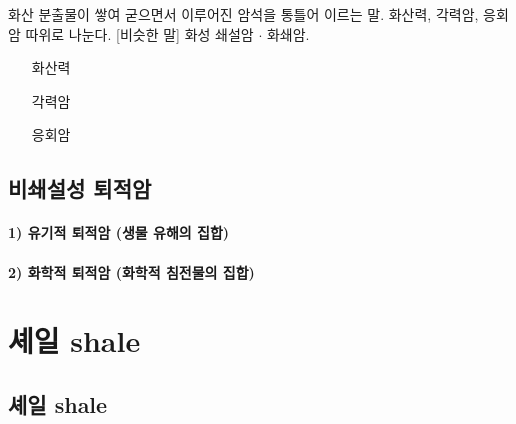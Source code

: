 \documentclass[12pt, a4paper, twoside]{book}
\begin{document}
					화산 분출물이 쌓여 굳으면서 이루어진 암석을 통틀어 이르는 말. 화산력, 각력암, 응회암 따위로 나눈다. 
					[비슷한 말] 화성 쇄설암 $\cdot$ 화쇄암.

				\begin{itemize}[topsep=0.0em, parsep=0.0em, itemsep=0em, leftmargin=6.0em, labelwidth=3em, labelsep=3em] 
				\item [화산력]
				\item [각력암]
				\item [응회암]
				\end{itemize}

		\subsection{비쇄설성 퇴적암}

			\paragraph{1) 유기적 퇴적암 (생물 유해의 집합)} 

			\paragraph{2) 화학적 퇴적암 (화학적 침전물의 집합)}


	
	
	
	
	
	
	
	
	
	
	
	
	
	
	
	
	
	
	
	
	
	
	
	
	
	
	
	
	
	
	
	\clearpage
	\section{셰일  shale }


		\subsection{셰일 shale}
		
\end{document}
